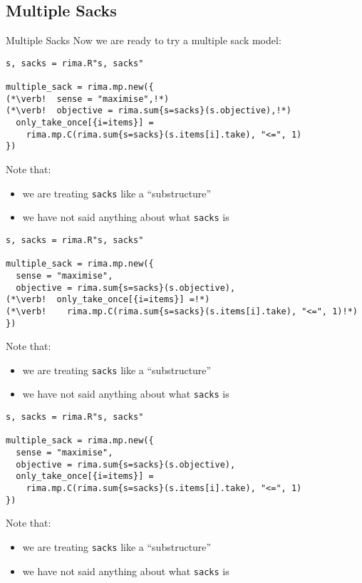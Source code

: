 \documentclass[smaller,handout]{beamer}
\begin{document}
\subsection{Multiple Sacks}
\begin{frame}[fragile]{Multiple Sacks}
  Now we are ready to try a multiple sack model:
  \vspace{-2ex}
  \begin{overprint}%
%
  \begin{lstlisting}
s, sacks = rima.R"s, sacks"

multiple_sack = rima.mp.new({
(*\verb!  sense = "maximise",!*)
(*\verb!  objective = rima.sum{s=sacks}(s.objective),!*)
  only_take_once[{i=items}] =
    rima.mp.C(rima.sum{s=sacks}(s.items[i].take), "<=", 1)
})
  \end{lstlisting}
  Note that:
  \begin{itemize}
    \item we are treating \lstinline!sacks! like a ``substructure''
    \item we have not said anything about what \lstinline!sacks! is
   \end{itemize}

  \begin{lstlisting}
s, sacks = rima.R"s, sacks"

multiple_sack = rima.mp.new({
  sense = "maximise",
  objective = rima.sum{s=sacks}(s.objective),
(*\verb!  only_take_once[{i=items}] =!*)
(*\verb!    rima.mp.C(rima.sum{s=sacks}(s.items[i].take), "<=", 1)!*)
})
  \end{lstlisting}
  Note that:
  \begin{itemize}
    \item we are treating \lstinline!sacks! like a ``substructure''
    \item we have not said anything about what \lstinline!sacks! is
   \end{itemize}

  \begin{lstlisting}
s, sacks = rima.R"s, sacks"

multiple_sack = rima.mp.new({
  sense = "maximise",
  objective = rima.sum{s=sacks}(s.objective),
  only_take_once[{i=items}] =
    rima.mp.C(rima.sum{s=sacks}(s.items[i].take), "<=", 1)
})
  \end{lstlisting}
  Note that:
  \begin{itemize}
    \item we are treating \lstinline!sacks! like a ``substructure''
    \item we have not said anything about what \lstinline!sacks! is
   \end{itemize}

  \end{overprint}
\end{frame}
\end{document}
